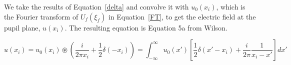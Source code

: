     







We take the results of Equation~\ref{delta} and convolve it with $u_0(x_i)$, which is the Fourier transform of $U_f(\xi_f)$ in Equation~\ref{FT}, to get the electric field at the pupil plane, $u(x_i)$. The resulting equation is Equation 5a from Wilson.\cite{wilson1975wavefront}



\begin{equation}
    u(x_i)= u_0(x_i) \circledast \left(
        \frac{i}{2\pi x_i}+\frac{1}{2}\delta(-x_i)
    \right)
    =
    \int_{-\infty}^\infty
    u_0(x') \left[
        \frac{1}{2}\delta(x'-x_i)+\frac{i}{2\pi}\frac{1}{x_i-x'}
    \right] dx' 
    \label{KEconv}
\end{equation}

